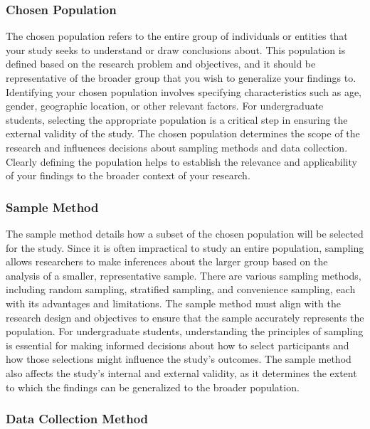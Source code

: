 \documentclass[
]{book}
\begin{document}
\subsubsection*{Chosen Population}\label{chosen-population}

The chosen population refers to the entire group of individuals or entities that your study seeks to understand or draw conclusions about. This population is defined based on the research problem and objectives, and it should be representative of the broader group that you wish to generalize your findings to. Identifying your chosen population involves specifying characteristics such as age, gender, geographic location, or other relevant factors. For undergraduate students, selecting the appropriate population is a critical step in ensuring the external validity of the study. The chosen population determines the scope of the research and influences decisions about sampling methods and data collection. Clearly defining the population helps to establish the relevance and applicability of your findings to the broader context of your research.

\subsubsection*{Sample Method}\label{sample-method}

The sample method details how a subset of the chosen population will be selected for the study. Since it is often impractical to study an entire population, sampling allows researchers to make inferences about the larger group based on the analysis of a smaller, representative sample. There are various sampling methods, including random sampling, stratified sampling, and convenience sampling, each with its advantages and limitations. The sample method must align with the research design and objectives to ensure that the sample accurately represents the population. For undergraduate students, understanding the principles of sampling is essential for making informed decisions about how to select participants and how those selections might influence the study's outcomes. The sample method also affects the study's internal and external validity, as it determines the extent to which the findings can be generalized to the broader population.

\subsubsection*{Data Collection Method}\label{data-collection-method}
\end{document}
